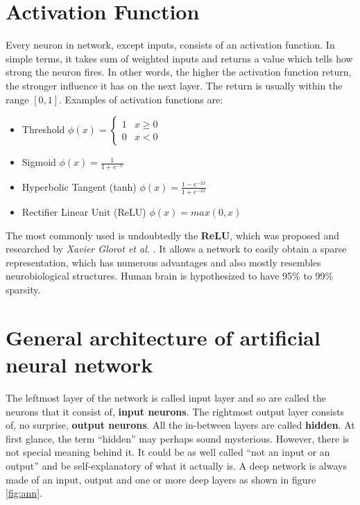 \section{Activation Function}
\label{sec:activation-function}

Every neuron in network, except inputs, consists of an activation function. In simple terms, it takes sum of weighted inputs and returns a value which tells how strong the neuron fires. In other words, the higher the activation function return, the stronger influence it has on the next layer. The return is usually within the range $[0, 1]$. Examples of activation functions are: 
\begin{itemize}
    \item Threshold \hspace{5pt}
        $\phi(x) = 
        \begin{cases}
            1 & x \ge 0 \\
            0 & x<0
        \end{cases}$
    \item Sigmoid \hspace{5pt}
        $\phi(x) = \frac{1}{1+e^{-x}}$
    \item Hyperbolic Tangent (tanh) \hspace{5pt}
        $\phi(x) = \frac{1-e^{-2x}}{1+e^{-2x}}$
    \item Rectifier Linear Unit (ReLU) \hspace{5pt}
        $\phi(x) = max(0, x)$
\end{itemize}

The most commonly used is undoubtedly the \textbf{ReLU}, which was proposed and researched by \emph{Xavier Glorot et al.} \cite{DeepSparseReNN}. It allows a network to easily obtain a sparse representation, which has numerous advantages and also mostly resembles neurobiological structures. Human brain is hypothesized to have 95\% to 99\% sparsity.

\section{General architecture of artificial neural network}
\label{sec:general-architecture-ann}

The leftmost layer of the network is called input layer and so are called the neurons that it consist of, \textbf{input neurons}. The rightmost output layer consists of, no surprise, \textbf{output neurons}. All the in-between layers are called \textbf{hidden}. At first glance, the term ``hidden'' may perhaps sound mysterious. However, there is not special meaning behind it. It could be as well called ``not an input or an output'' and be self-explanatory of what it actually is. A deep network is always made of an input, output and one or more deep layers as shown in figure \ref{fig:ann}.

